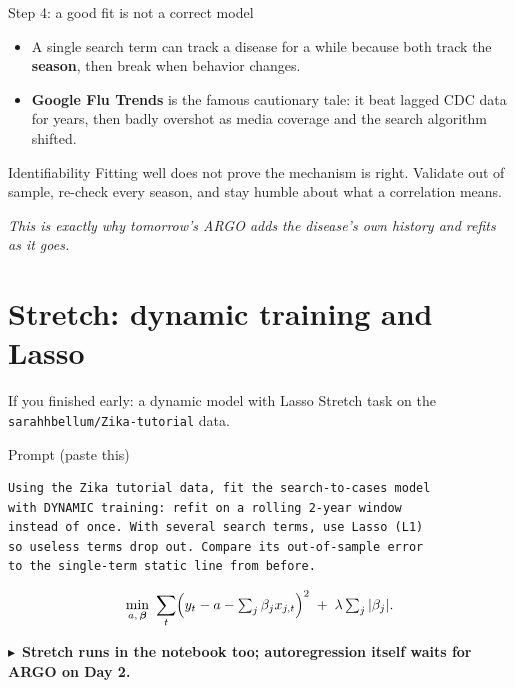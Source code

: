\documentclass[aspectratio=169,11pt]{beamer}
\newcommand{\tonb}[1]{\vspace{0.1em}\begin{flushright}\footnotesize\textcolor{AccentB}{$\blacktriangleright$~\textbf{#1}}\end{flushright}}
\begin{document}
\begin{frame}{Step 4: a good fit is not a correct model}
  \begin{itemize}
    \item A single search term can track a disease for a while because both track the
          \textbf{season}, then break when behavior changes.
    \item \textbf{Google Flu Trends} is the famous cautionary tale: it beat lagged CDC
          data for years, then badly overshot as media coverage and the search algorithm
          shifted.
  \end{itemize}
  \vspace{0.3em}
  \begin{alertblock}{Identifiability}
    Fitting well does not prove the mechanism is right. Validate out of sample, re-check
    every season, and stay humble about what a correlation means.
  \end{alertblock}
  \begin{center}
    \itshape This is exactly why tomorrow's ARGO adds the disease's own history and
    refits as it goes.
  \end{center}
\end{frame}

\section{Stretch: dynamic training and Lasso}

\begin{frame}[fragile]{If you finished early: a dynamic model with Lasso}
  Stretch task on the \texttt{sarahhbellum/Zika-tutorial} data.
  \begin{block}{Prompt (paste this)}
  \begin{lstlisting}
Using the Zika tutorial data, fit the search-to-cases model
with DYNAMIC training: refit on a rolling 2-year window
instead of once. With several search terms, use Lasso (L1)
so useless terms drop out. Compare its out-of-sample error
to the single-term static line from before.
  \end{lstlisting}
  \end{block}
  \[
    \min_{a,\,\boldsymbol\beta}\ \sum_t\Bigl(y_t-a-\textstyle\sum_j \beta_j x_{j,t}\Bigr)^2
    \;+\; \lambda\sum_j |\beta_j| .
  \]
  \tonb{Stretch runs in the notebook too; autoregression itself waits for ARGO on Day 2.}
\end{frame}
\end{document}
